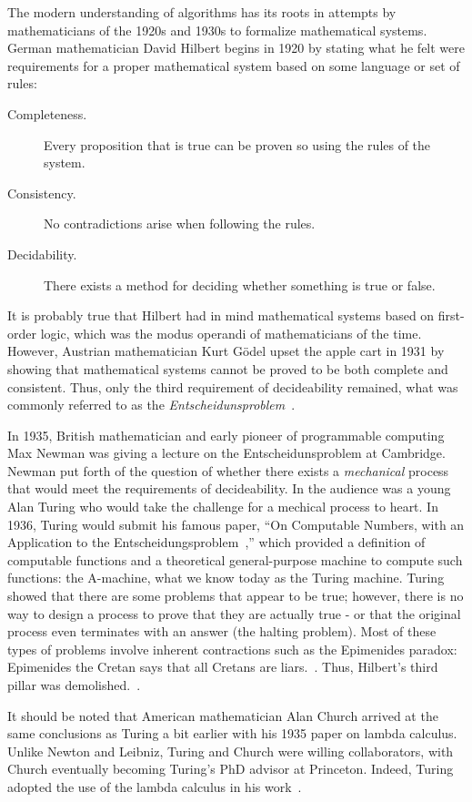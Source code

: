 The modern understanding of algorithms has its roots in attempts by mathematicians of the 1920s and 1930s to
formalize mathematical systems.  German mathematician David Hilbert begins in 1920 by stating what he felt were
requirements for a proper mathematical system based on some language or set of rules:

\begin{description}
\item[Completeness.] Every proposition that is true can be proven so using the rules of the system.
\item[Consistency.] No contradictions arise when following the rules.
\item[Decidability.] There exists a method for deciding whether something is true or false.
\end{description}

It is probably true that Hilbert had in mind mathematical systems based on first-order logic, which was the modus
operandi of mathematicians of the time.  However, Austrian mathematician Kurt G\"{o}del upset the apple cart in
1931 by showing that mathematical systems cannot be proved to be both complete and consistent.  Thus, only the
third requirement of decideability remained, what was commonly referred to as the
\emph{Entscheidunsproblem}~\cite{dturing}.

In 1935, British mathematician and early pioneer of programmable computing Max Newman was giving a lecture on the
Entscheidunsproblem at Cambridge.  Newman put forth of the question of whether there exists a \emph{mechanical}
process that would meet the requirements of decideability.  In the audience was a young Alan Turing who would take
the challenge for a mechical process to heart.  In 1936, Turing would submit his famous paper, ``On Computable
Numbers, with an Application to the Entscheidungsproblem~\cite{aturing},'' which provided a definition of
computable functions and a theoretical general-purpose machine to compute such functions: the A-machine, what we
know today as the Turing machine.  Turing showed that there are some problems that appear to be true; however,
there is no way to design a process to prove that they are actually true - or that the original process even
terminates with an answer (the halting problem).  Most of these types of problems involve inherent contractions
such as the Epimenides paradox: Epimenides the Cretan says that all Cretans are liars.~\cite{dturing}.  Thus,
Hilbert's third pillar was demolished.~\cite{dturing}.

It should be noted that American mathematician Alan Church arrived at the same conclusions as Turing a bit earlier
with his 1935 paper on lambda calculus.  Unlike Newton and Leibniz, Turing and Church were willing collaborators,
with Church eventually becoming Turing's PhD advisor at Princeton.  Indeed, Turing adopted the use of the lambda
calculus in his work~\cite{dturing}.

